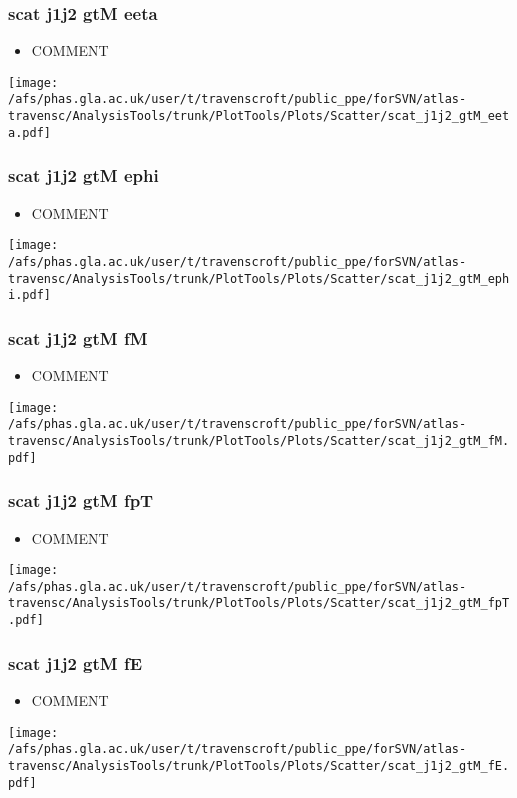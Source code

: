 \documentclass{beamer}
\begin{document}
\begin{frame}
\frametitle{scat j1j2 gtM eeta}
\begin{itemize}
\item COMMENT
\end{itemize}
\begin{center}
\texttt{[image: /afs/phas.gla.ac.uk/user/t/travenscroft/public\_ppe/forSVN/atlas-travensc/AnalysisTools/trunk/PlotTools/Plots/Scatter/scat\_j1j2\_gtM\_eeta.pdf]}
\end{center}
\end{frame}

\begin{frame}
\frametitle{scat j1j2 gtM ephi}
\begin{itemize}
\item COMMENT
\end{itemize}
\begin{center}
\texttt{[image: /afs/phas.gla.ac.uk/user/t/travenscroft/public\_ppe/forSVN/atlas-travensc/AnalysisTools/trunk/PlotTools/Plots/Scatter/scat\_j1j2\_gtM\_ephi.pdf]}
\end{center}
\end{frame}

\begin{frame}
\frametitle{scat j1j2 gtM fM}
\begin{itemize}
\item COMMENT
\end{itemize}
\begin{center}
\texttt{[image: /afs/phas.gla.ac.uk/user/t/travenscroft/public\_ppe/forSVN/atlas-travensc/AnalysisTools/trunk/PlotTools/Plots/Scatter/scat\_j1j2\_gtM\_fM.pdf]}
\end{center}
\end{frame}

\begin{frame}
\frametitle{scat j1j2 gtM fpT}
\begin{itemize}
\item COMMENT
\end{itemize}
\begin{center}
\texttt{[image: /afs/phas.gla.ac.uk/user/t/travenscroft/public\_ppe/forSVN/atlas-travensc/AnalysisTools/trunk/PlotTools/Plots/Scatter/scat\_j1j2\_gtM\_fpT.pdf]}
\end{center}
\end{frame}

\begin{frame}
\frametitle{scat j1j2 gtM fE}
\begin{itemize}
\item COMMENT
\end{itemize}
\begin{center}
\texttt{[image: /afs/phas.gla.ac.uk/user/t/travenscroft/public\_ppe/forSVN/atlas-travensc/AnalysisTools/trunk/PlotTools/Plots/Scatter/scat\_j1j2\_gtM\_fE.pdf]}
\end{center}
\end{frame}
\end{document}
